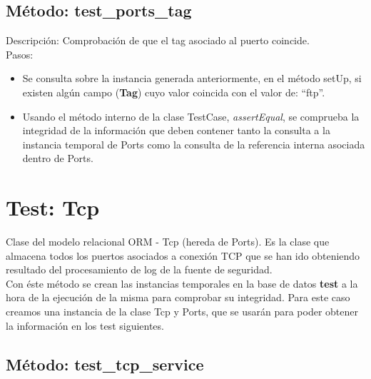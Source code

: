 

\subsection{\quad Método: test\_ports\_tag}

Descripción: Comprobación de que el tag asociado al puerto coincide.\\
Pasos:
\begin{itemize}
\item Se consulta sobre la instancia generada anteriormente, en el método setUp, si existen algún campo (\textbf{Tag}) cuyo valor coincida con el valor de: ``ftp''.
\item Usando el método interno de la clase TestCase, \emph{assertEqual}, se comprueba la integridad de la información que deben contener tanto la consulta a la instancia temporal de Ports como la consulta de la referencia interna asociada dentro de Ports.
\end{itemize}



\section{\quad Test: Tcp}

Clase del modelo relacional ORM - Tcp (hereda de Ports). Es la clase que almacena todos los puertos asociados a conexión TCP que se han ido obteniendo resultado del procesamiento de log de la fuente de seguridad.\\

Con éste método se crean las instancias temporales en la base de datos \textbf{test} a la hora de la ejecución de la misma para comprobar su integridad. Para este caso creamos una instancia de la clase Tcp y Ports, que se usarán para poder obtener la información en los test siguientes.\\



\subsection{\quad Método: test\_tcp\_service}


